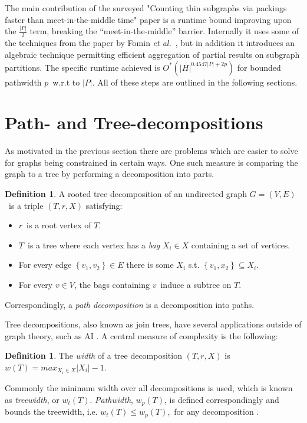 \documentclass[a4paper,11pt]{report}
\theoremstyle{plain}
\theoremstyle{definition}
\newtheorem{defn}[thm]{Definition} %
\begin{document}
The main contribution of the surveyed "Counting thin subgraphs via packings faster than meet-in-the-middle time" paper \cite{BHKK13} is a runtime bound improving upon the $\frac{|P|}{2}$ term, breaking the ``meet-in-the-middle'' barrier.
Internally it uses some of the techniques from the paper by Fomin \emph{et al.}~\cite{FLRRS12},
but in addition it introduces an algebraic technique permitting efficient aggregation of partial results on subgraph partitions.
The specific runtime achieved is $O^*(|H|^{0.4547|P| + 2p})$ for bounded pathwidth $p$ w.r.t to $|P|$.
All of these steps are outlined in the following sections.


\section{Path- and Tree-decompositions}
As motivated in the previous section there are problems which are easier to solve for graphs being constrained in certain ways.
One such measure is comparing the graph to a tree by performing a decomposition into parts.

\begin{defn}
A rooted tree decomposition of an undirected graph $G = (V, E)$ is a triple $(T, r, X)$ satisfying:
\begin{itemize}
\item $r$ is a root vertex of $T$.
\item $T$ is a tree where each vertex has a \emph{bag} $X_i \in X$ containing a set of vertices.
\item For every edge $\left\{v_1, v_2\right\} \in E$ there is some $X_i$ s.t. $\left\{v_1, x_2\right\} \subseteq X_i$.
\item For every $v \in V$, the bags containing $v$ induce a subtree on $T$.
\end{itemize}
\end{defn}

Correspondingly, a \emph{path decomposition} is a decomposition into paths.

Tree decompositions, also known as join trees, have several applications outside of graph theory, such as AI \cite{carr00}.
A central measure of complexity is the following:

\begin{defn}
The \emph{width} of a tree decomposition $(T, r, X)$ is $w(T) = max_{X_i \in X} |X_i| - 1$.
\end{defn}
Commonly the minimum width over all decompositions is used, which is known as \emph{treewidth}, or $w_t(T)$.
\emph{Pathwidth}, $w_p(T)$, is defined correspondingly and bounds the treewidth, i.e. $w_t(T) \leq w_p(T)$, for any decomposition \cite{kintali12}.
\end{document}
